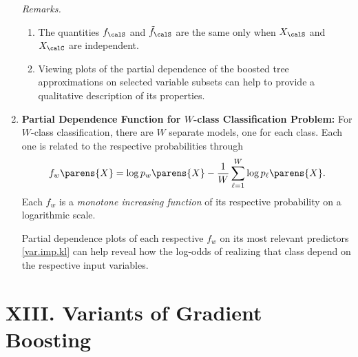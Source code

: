 \documentclass[12pt]{article}
\begin{document}
\begin{enumerate}[label=\textbf{\arabic*.}]
	\textit{Remarks.} 
	\begin{enumerate}
		\item The quantities $f_{\calS}$ and $\tilde{f}_{\calS}$ are the same only when $X_{\calS}$ and $X_{\calC}$ are independent. 
		\item Viewing plots of the partial dependence of the boosted tree approximations on selected variable subsets can help to provide a qualitative description of its properties. 
	\end{enumerate}
	
	\item \textbf{Partial Dependence Function for $W$-class Classification Problem:} For $W$-class classification, there are $W$ separate models, one for each class. Each one is related to the respective probabilities through
	\begin{align*}
		f_w \parens{X} = \log p_w \parens{X} - \frac{1}{W} \sum_{\ell=1}^W \log p_{\ell} \parens{X}. 
	\end{align*}
	Each $f_w$ is a \textit{monotone increasing function} of its respective probability on a logarithmic scale. 
	
	Partial dependence plots of each respective $f_w$ on its most relevant predictors \eqref{var.imp.kl} can help reveal how the log-odds of realizing that class depend on the respective input variables. 
	
\end{enumerate}


\section*{XIII. Variants of Gradient Boosting}
\end{document}
